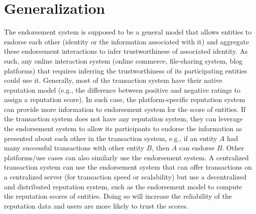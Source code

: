 \section{Generalization}\label{generalization}
The endorsement system is supposed to be a general model that allows entities
to endorse each other (identity or the information associated with it) and
aggregate these endorsement interactions to infer trustworthiness of associated
identity. As such, any online interaction system (online commerce, file-sharing
system, blog platforms) that requires inferring the trustworthiness of its
participating entities could use it. Generally, most of the transaction system
have their native reputation model (e.g., the difference between positive and
negative ratings to assign a reputation score). In such case, the
platform-specific reputation system can provide more information to endorsement
system for the score of entities. If the transaction system does not have any
reputation system, they can leverage the endorsement system to allow its
participants to endorse the information as presented about each other in the
transaction system, e.g., if an entity $A$ had many successful transactions
with other entity $B$, then $A$ can endorse $B$. Other platforms/use cases can
also similarly use the endorsement system. A centralized transaction system can
use the endorsement system that can offer transactions on a centralized server
(for transaction speed or scalability) but use a decentralized and distributed
reputation system, such as the endorsement model to compute the reputation
scores of entities. Doing so will increase the reliability of the reputation
data and users are more likely to trust the scores.





